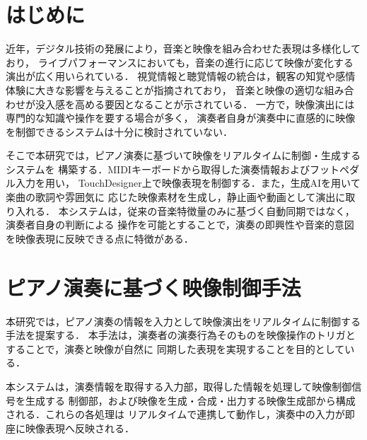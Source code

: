 

\section{はじめに}
近年，デジタル技術の発展により，音楽と映像を組み合わせた表現は多様化しており，
ライブパフォーマンスにおいても，音楽の進行に応じて映像が変化する演出が広く用いられている．
視覚情報と聴覚情報の統合は，観客の知覚や感情体験に大きな影響を与えることが指摘されており，
音楽と映像の適切な組み合わせが没入感を高める要因となることが示されている\cite{asano}．
一方で，映像演出には専門的な知識や操作を要する場合が多く，
演奏者自身が演奏中に直感的に映像を制御できるシステムは十分に検討されていない．

そこで本研究では，ピアノ演奏に基づいて映像をリアルタイムに制御・生成するシステムを
構築する．MIDIキーボードから取得した演奏情報およびフットペダル入力を用い，
TouchDesigner\cite{TouchDesigner}上で映像表現を制御する．また，生成AIを用いて楽曲の歌詞や雰囲気に
応じた映像素材を生成し，静止画や動画として演出に取り入れる．
本システムは，従来の音楽特徴量のみに基づく自動同期ではなく，演奏者自身の判断による
操作を可能とすることで，演奏の即興性や音楽的意図を映像表現に反映できる点に特徴がある．

\section{ピアノ演奏に基づく映像制御手法}
本研究では，ピアノ演奏の情報を入力として映像演出をリアルタイムに制御する手法を提案する．
本手法は，演奏者の演奏行為そのものを映像操作のトリガとすることで，演奏と映像が自然に
同期した表現を実現することを目的としている．

本システムは，演奏情報を取得する入力部，取得した情報を処理して映像制御信号を生成する
制御部，および映像を生成・合成・出力する映像生成部から構成される．これらの各処理は
リアルタイムで連携して動作し，演奏中の入力が即座に映像表現へ反映される．

